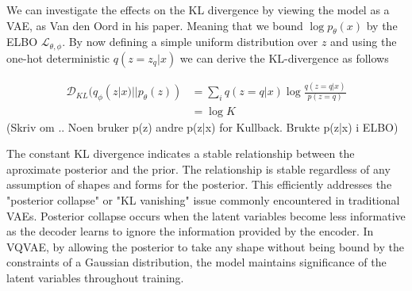 We can investigate the effects on the KL divergence by viewing the model as a VAE, as Van den Oord in his paper. Meaning that we bound $\log p_\theta(x)$ by the ELBO $\mathcal{L}_{\theta, \phi}$.
By now defining a simple uniform distribution over $z$ and using the one-hot deterministic $q(z=z_q|x)$ we can derive the KL-divergence as follows

\begin{equation}
    \begin{aligned}
        \mathcal{D}_{KL}(q_\phi(z|x) || p_\theta(z)) &= \sum_i q(z=q|x) \log \frac{ q(z=q|x)}{p(z=q)} \\
        &= \log K
    \end{aligned}
\end{equation}
(Skriv om .. Noen bruker p(z) andre p(z|x) for Kullback. Brukte p(z|x) i ELBO)

The constant KL divergence indicates a stable relationship between the aproximate posterior and the prior. The relationship is stable regardless of any assumption of shapes and forms for the posterior. This efficiently
addresses the "posterior collapse" or "KL vanishing"\cite{posteriorcollapse} issue commonly encountered in traditional VAEs. Posterior collapse occurs when the latent variables become less informative as the decoder learns to ignore the information provided by the 
encoder. In VQVAE, by allowing the posterior to take any shape without being bound by the constraints of a Gaussian distribution, the model maintains significance of the latent variables throughout training. 
